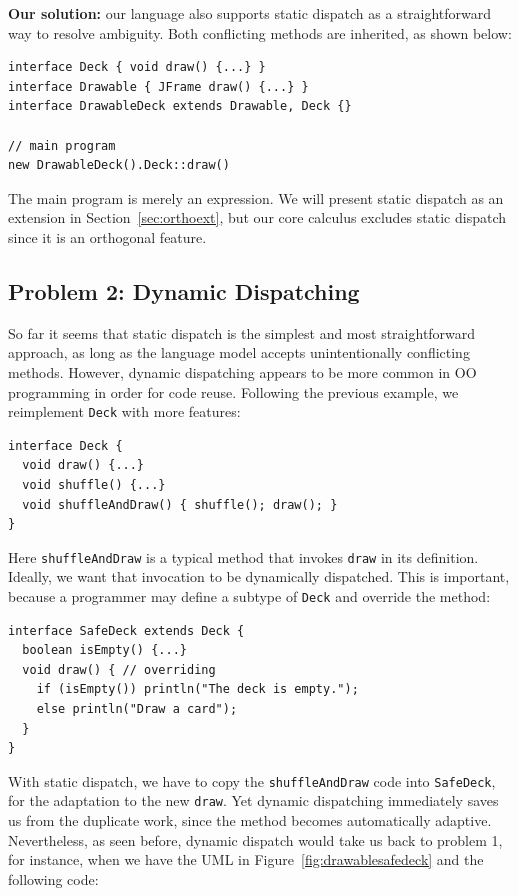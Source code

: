 
\noindent\textbf{Our solution:} our language also supports static dispatch as a straightforward
way to resolve ambiguity. Both conflicting methods are inherited, as shown below:
  \vspace{3pt}\begin{lstlisting}
interface Deck { void draw() {...} }
interface Drawable { JFrame draw() {...} }
interface DrawableDeck extends Drawable, Deck {}

// main program
new DrawableDeck().Deck::draw()
\end{lstlisting}\vspace{3pt}
The main program is merely an expression. We will
present static dispatch as an extension in Section~\ref{sec:orthoext}, but our core calculus
excludes static dispatch
since it is an orthogonal feature.


\subsection{Problem 2: Dynamic Dispatching}
So far it seems that static dispatch is the simplest and most straightforward approach,
as long as the language model accepts unintentionally conflicting methods. However, dynamic
dispatching appears to be more common in OO programming in order for code reuse. Following the previous example,
we reimplement \lstinline|Deck| with more features:

\vspace{3pt}\begin{lstlisting}
interface Deck {
  void draw() {...}
  void shuffle() {...}
  void shuffleAndDraw() { shuffle(); draw(); }
}
\end{lstlisting}\vspace{3pt}
Here \lstinline|shuffleAndDraw| is a typical method that invokes \lstinline|draw| in its definition. Ideally,
we want that invocation to be dynamically dispatched. This is important, because a programmer may define a subtype
of \lstinline|Deck| and override the method:

\vspace{3pt}\begin{lstlisting}
interface SafeDeck extends Deck {
  boolean isEmpty() {...}
  void draw() { // overriding
    if (isEmpty()) println("The deck is empty.");
    else println("Draw a card");
  }
}
\end{lstlisting}\vspace{3pt}
With static dispatch, we have to copy the \lstinline|shuffleAndDraw| code into \lstinline|SafeDeck|,
for the adaptation to the new \lstinline|draw|. Yet dynamic dispatching immediately saves us from the duplicate work,
since the method becomes automatically adaptive. Nevertheless, as seen before, dynamic dispatch would take us back to problem
1, for instance, when we
have the UML in Figure~\ref{fig:drawablesafedeck} and the following code:

